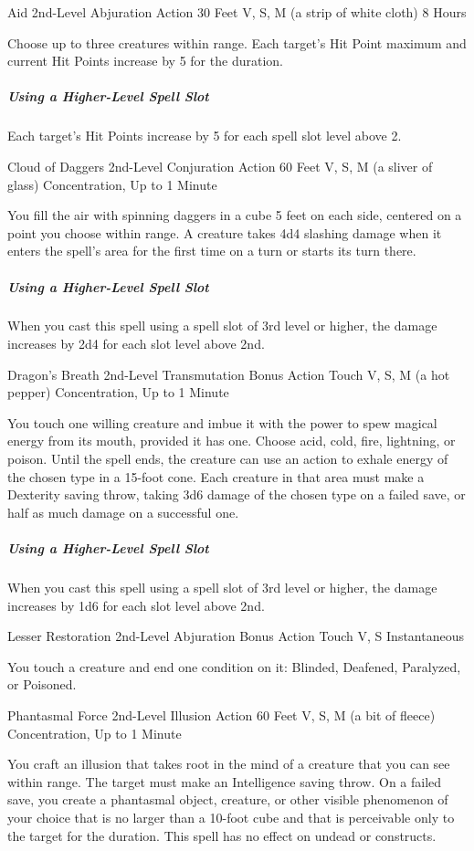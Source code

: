 \documentclass[letterpaper,openany,oneside,twocolumn]{book}
\begin{document}
\DndSpellHeader
  {Aid}
  {2nd-Level Abjuration}
  {Action}
  {30 Feet}
  {V, S, M (a strip of white cloth)}
  {8 Hours}

Choose up to three creatures within range. Each target's Hit Point maximum and current Hit Points increase by 5 for the duration.

\subparagraph*{Using a Higher-Level Spell Slot} Each target's Hit Points increase by 5 for each spell slot level above 2.

\DndSpellHeader
  {Cloud of Daggers}
  {2nd-Level Conjuration}
  {Action}
  {60 Feet}
  {V, S, M (a sliver of glass)}
  {Concentration, Up to 1 Minute}

You fill the air with spinning daggers in a cube 5 feet on each side, centered on a point you choose within range. A creature takes 4d4 slashing damage when it enters the spell's area for the first time on a turn or starts its turn there.

\subparagraph*{Using a Higher-Level Spell Slot} When you cast this spell using a spell slot of 3rd level or higher, the damage increases by 2d4 for each slot level above 2nd.

\DndSpellHeader
  {Dragon's Breath}
  {2nd-Level Transmutation}
  {Bonus Action}
  {Touch}
  {V, S, M (a hot pepper)}
  {Concentration, Up to 1 Minute}

You touch one willing creature and imbue it with the power to spew magical energy from its mouth, provided it has one. Choose acid, cold, fire, lightning, or poison. Until the spell ends, the creature can use an action to exhale energy of the chosen type in a 15-foot cone. Each creature in that area must make a Dexterity saving throw, taking 3d6 damage of the chosen type on a failed save, or half as much damage on a successful one.

\subparagraph*{Using a Higher-Level Spell Slot} When you cast this spell using a spell slot of 3rd level or higher, the damage increases by 1d6 for each slot level above 2nd.

\DndSpellHeader
  {Lesser Restoration}
  {2nd-Level Abjuration}
  {Bonus Action}
  {Touch}
  {V, S}
  {Instantaneous}

You touch a creature and end one condition on it: Blinded, Deafened, Paralyzed, or Poisoned.

\DndSpellHeader
  {Phantasmal Force}
  {2nd-Level Illusion}
  {Action}
  {60 Feet}
  {V, S, M (a bit of fleece)}
  {Concentration, Up to 1 Minute}

You craft an illusion that takes root in the mind of a creature that you can see within range. The target must make an Intelligence saving throw. On a failed save, you create a phantasmal object, creature, or other visible phenomenon of your choice that is no larger than a 10-foot cube and that is perceivable only to the target for the duration. This spell has no effect on undead or constructs.
\end{document}
